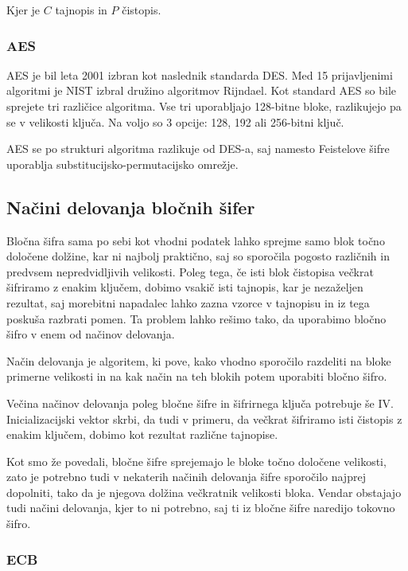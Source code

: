 \documentclass[12pt,a4paper,openany,tikz]{book}
\theoremstyle{plain}
\theoremstyle{definition}
\begin{document}
Kjer je $C$ tajnopis in $P$ čistopis.

\subsubsection{AES}
\label{subs:AES}


\gls{AES} je bil leta 2001 izbran kot naslednik standarda \gls{DES}. Med 15 prijavljenimi algoritmi je \gls{NIST} izbral družino algoritmov Rijndael. Kot standard \gls{AES} so bile sprejete tri različice algoritma. Vse tri uporabljajo 128-bitne bloke, razlikujejo pa se v velikosti ključa. Na voljo so 3 opcije: 128, 192 ali 256-bitni ključ.

\gls{AES} se po strukturi algoritma razlikuje od \gls{DES}-a, saj namesto Feistelove šifre uporablja substitucijsko-permutacijsko omrežje.

\subsection{Načini delovanja bločnih šifer}
\label{sub:Nacini delovanja blocnih sifer}

Bločna šifra sama po sebi kot vhodni podatek lahko sprejme samo blok točno določene dolžine, kar ni najbolj praktično, saj so sporočila pogosto različnih in predvsem nepredvidljivih velikosti. Poleg tega, če isti blok čistopisa večkrat šifriramo z enakim ključem, dobimo vsakič isti tajnopis, kar je nezaželjen rezultat, saj morebitni napadalec lahko zazna vzorce v tajnopisu in iz tega poskuša razbrati pomen. Ta problem lahko rešimo tako, da uporabimo bločno šifro v enem od načinov delovanja.

Način delovanja je algoritem, ki pove, kako vhodno sporočilo razdeliti na bloke primerne velikosti in na kak način na teh blokih potem uporabiti bločno šifro.

Večina načinov delovanja poleg bločne šifre in šifrirnega ključa potrebuje še \gls{IV}. Inicializacijski vektor skrbi, da tudi v primeru, da večkrat šifriramo isti čistopis z enakim ključem, dobimo kot rezultat različne tajnopise.

Kot smo že povedali, bločne šifre sprejemajo le bloke točno določene velikosti, zato je potrebno tudi v nekaterih načinih delovanja šifre sporočilo najprej dopolniti, tako da je njegova dolžina večkratnik velikosti bloka. Vendar obstajajo tudi načini delovanja, kjer to ni potrebno, saj ti iz bločne šifre naredijo tokovno šifro.


\subsubsection{ECB}
\label{subs:ECB}
\end{document}
